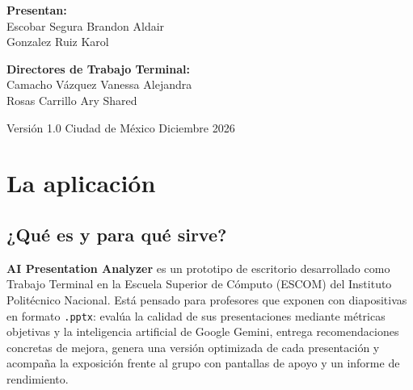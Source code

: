 \documentclass[11pt]{article}
\begin{document}
\begin{titlepage}
  \noindent
  \begin{minipage}[t]{0.48\textwidth}
      \centering
      {\large\textbf{Presentan:}}\\[0.35cm]
      {\large Escobar Segura Brandon Aldair}\\[0.15cm]
      {\large Gonzalez Ruiz Karol}
  \end{minipage}\hfill
  \begin{minipage}[t]{0.48\textwidth}
      \centering
      {\large\textbf{Directores de Trabajo Terminal:}}\\[0.35cm]
      {\large Camacho Vázquez Vanessa Alejandra}\\[0.15cm]
      {\large Rosas Carrillo Ary Shared}
  \end{minipage}

  \vfill

  \begin{center}
      {\large Versión 1.0 \quad\textcolor{oro}{\textbullet}\quad
       Ciudad de México \quad\textcolor{oro}{\textbullet}\quad Diciembre 2026}
  \end{center}
\end{titlepage}

\tableofcontents
\newpage


\section{La aplicación}
\label{sec:overview}

\subsection{¿Qué es y para qué sirve?}
\label{subsec:que-es}

\textbf{AI Presentation Analyzer} es un prototipo de escritorio desarrollado como
Trabajo Terminal en la Escuela Superior de Cómputo (ESCOM) del Instituto Politécnico
Nacional. Está pensado para profesores que exponen con diapositivas en formato
\texttt{.pptx}: evalúa la calidad de sus presentaciones mediante métricas objetivas y
la inteligencia artificial de Google Gemini, entrega recomendaciones concretas de
mejora, genera una versión optimizada de cada presentación y acompaña la exposición
frente al grupo con pantallas de apoyo y un informe de rendimiento.
\end{document}
